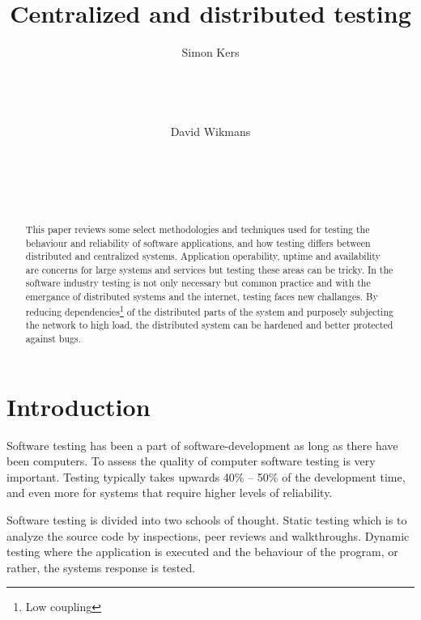 \documentclass[10pt]{sensys-abstract}
\author{
%
\alignauthor Simon Kers\\
   \email{\url{skers@kth.se}}\\
   \affaddr{School of Technology and Health}\\
   \affaddr{KTH Royal Institute of Technology}\\
   \affaddr{February 2013}\\
\alignauthor David Wikmans\\
   \email{\url{wikmans@kth.se}}\\
   \affaddr{School of Technology and Health}\\
   \affaddr{KTH Royal Institute of Technology}\\
   \affaddr{February 2013}\\
}
\title{Centralized and distributed testing}
\begin{document}
\maketitle

\begin{abstract}
\noindent
This paper reviews some select methodologies and techniques used for testing the behaviour and reliability of software applications, and how testing differs between distributed and centralized systems.
Application operability, uptime and availability are concerns for large systems and services but testing these areas can be tricky.
In the software industry testing is not only necessary but common practice and with the emergance of distributed systems and the internet, testing faces new challanges.
By reducing dependencies\footnote{Low coupling} of the distributed parts of the system and purposely subjecting the network to high load, the distributed system can be hardened and better protected against bugs.

\end{abstract}




\section{Introduction}
  \label{sec:intro}
\noindent
Software testing has been a part of software-development as long as there have been computers. To assess the quality of computer software testing is very important. Testing typically takes upwards 40\% -- 50\% of the development time, and even more for systems that require higher levels of reliability. \cite{testing_techniques}

Software testing is divided into two schools of thought. Static testing which is to analyze the source code by inspections, peer reviews and walkthroughs. Dynamic testing where the application is executed and the behaviour of the program, or rather, the systems response is tested.
\end{document}
